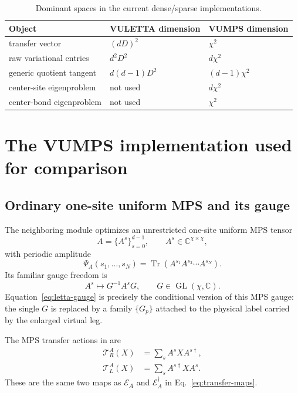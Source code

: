 \documentclass[11pt]{article}
\newcommand{\CC}{\mathbb{C}}
\newcommand{\E}{\mathcal{E}}
\newcommand{\Tr}{\operatorname{Tr}}
\newcommand{\code}[1]{\texttt{\detokenize{#1}}}
\begin{document}
\begin{table}[htbp]
  \centering
  \caption{Dominant spaces in the current dense/sparse implementations.}
  \label{tab:complexity-spaces}
  \begin{tabular}{@{}lll@{}}
    \toprule
    Object & VULETTA dimension & VUMPS dimension \\
    \midrule
    transfer vector & $(dD)^2$ & $\chi^2$ \\
    raw variational entries & $d^2D^2$ & $d\chi^2$ \\
    generic quotient tangent & $d(d-1)D^2$ & $(d-1)\chi^2$ \\
    center-site eigenproblem & not used & $d\chi^2$ \\
    center-bond eigenproblem & not used & $\chi^2$ \\
    \bottomrule
  \end{tabular}
\end{table}

\section{The VUMPS implementation used for comparison}
\label{sec:vumps}

\subsection{Ordinary one-site uniform MPS and its gauge}

The neighboring module  optimizes an unrestricted one-site
uniform MPS tensor
\begin{equation}
  A=\{A^s\}_{s=0}^{d-1},
  \qquad A^s\in\CC^{\chi\times\chi},
  \label{eq:ordinary-mps-tensor}
\end{equation}
with periodic amplitude
\begin{equation}
  \Psi_A(s_1,\ldots,s_N)
  =
  \Tr\!\left(A^{s_1}A^{s_2}\cdots A^{s_N}\right).
  \label{eq:ordinary-mps-amplitude}
\end{equation}
Its familiar gauge freedom is
\begin{equation}
  A^s\longmapsto G^{-1}A^sG,
  \qquad G\in\operatorname{GL}(\chi,\CC).
  \label{eq:ordinary-mps-gauge}
\end{equation}
Equation~\eqref{eq:letta-gauge} is precisely the conditional version of this
MPS gauge: the single $G$ is replaced by a family $\{G_p\}$ attached to the
physical label carried by the enlarged virtual leg.

The MPS transfer actions in \code{state.py} are
\begin{align}
  \mathcal T_R^A(X)&=\sum_s A^sX A^{s\dagger},
  \label{eq:vumps-right-transfer}\\
  \mathcal T_L^A(X)&=\sum_s A^{s\dagger}X A^s.
  \label{eq:vumps-left-transfer}
\end{align}
These are the same two maps as $\E_A$ and $\E_A^\dagger$ in
Eq.~\eqref{eq:transfer-maps}.
\end{document}
